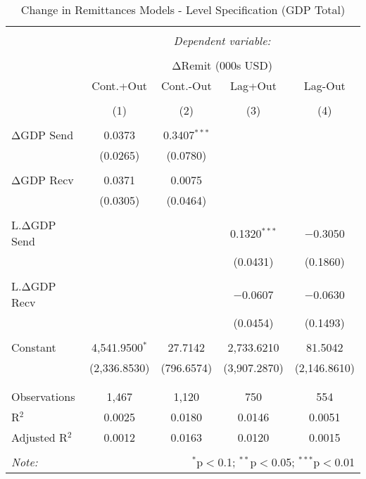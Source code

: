 
\begin{table}[!htbp] \centering 
  \caption{Change in Remittances Models - Level Specification (GDP Total)} 
  \label{} 
\begin{tabular}{@{\extracolsep{5pt}}lcccc} 
\\[-1.8ex]\hline 
\hline \\[-1.8ex] 
 & \multicolumn{4}{c}{\textit{Dependent variable:}} \\ 
\cline{2-5} 
\\[-1.8ex] & \multicolumn{4}{c}{ΔRemit (000s USD)} \\ 
 & Cont.+Out & Cont.-Out & Lag+Out & Lag-Out \\ 
\\[-1.8ex] & (1) & (2) & (3) & (4)\\ 
\hline \\[-1.8ex] 
 ΔGDP Send & 0.0373 & 0.3407$^{***}$ &  &  \\ 
  & (0.0265) & (0.0780) &  &  \\ 
  & & & & \\ 
 ΔGDP Recv & 0.0371 & 0.0075 &  &  \\ 
  & (0.0305) & (0.0464) &  &  \\ 
  & & & & \\ 
 L.ΔGDP Send &  &  & 0.1320$^{***}$ & $-$0.3050 \\ 
  &  &  & (0.0431) & (0.1860) \\ 
  & & & & \\ 
 L.ΔGDP Recv &  &  & $-$0.0607 & $-$0.0630 \\ 
  &  &  & (0.0454) & (0.1493) \\ 
  & & & & \\ 
 Constant & 4,541.9500$^{*}$ & 27.7142 & 2,733.6210 & 81.5042 \\ 
  & (2,336.8530) & (796.6574) & (3,907.2870) & (2,146.8610) \\ 
  & & & & \\ 
\hline \\[-1.8ex] 
Observations & 1,467 & 1,120 & 750 & 554 \\ 
R$^{2}$ & 0.0025 & 0.0180 & 0.0146 & 0.0051 \\ 
Adjusted R$^{2}$ & 0.0012 & 0.0163 & 0.0120 & 0.0015 \\ 
\hline 
\hline \\[-1.8ex] 
\textit{Note:}  & \multicolumn{4}{r}{$^{*}$p$<$0.1; $^{**}$p$<$0.05; $^{***}$p$<$0.01} \\ 
\end{tabular} 
\end{table} 
